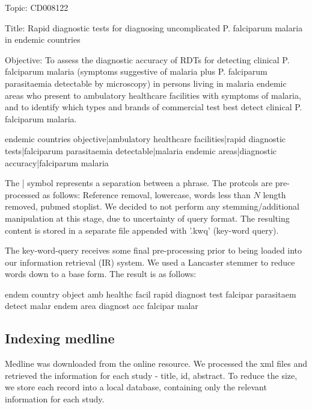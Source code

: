 \begin{tcolorbox}

Topic: CD008122 

Title: Rapid diagnostic tests for diagnosing uncomplicated P. falciparum malaria in endemic countries 

Objective: To assess the diagnostic accuracy of RDTs for detecting clinical P. falciparum malaria (symptoms suggestive of malaria plus P. falciparum parasitaemia detectable by microscopy) in persons living in malaria endemic areas who present to ambulatory healthcare facilities with symptoms of malaria, and to identify which types and brands of commercial test best detect clinical P. falciparum malaria.

\end{tcolorbox}

 
 
 
\begin{tcolorbox}

endemic countries objective|ambulatory healthcare facilities|rapid diagnostic tests|falciparum parasitaemia detectable|malaria endemic areas|diagnostic accuracy|falciparum malaria

\end{tcolorbox}

The | symbol represents a separation between a phrase. The protcols are pre-processed as follows: Reference removal, lowercase, words less than $N$ length removed, pubmed stoplist. We decided to not perform any stemming/additional manipulation at this stage, due to uncertainty of query format. The resulting content is stored in a separate file appended with '.kwq' (key-word query).

The key-word-query receives some final pre-processing prior to being loaded into our information retrieval (IR) system. We used a Lancaster stemmer to reduce words down to a base form. The result is as follows:

\begin{tcolorbox}

endem country object amb healthc facil rapid diagnost test falcipar parasitaem detect malar endem area diagnost acc falcipar malar

\end{tcolorbox}

\subsection{Indexing medline}

Medline was downloaded from the online resource. We processed the xml files and retrieved the  information for each study - title, id, abstract. To reduce the size, we store each record into a local database, containing only the relevant information for each study.

